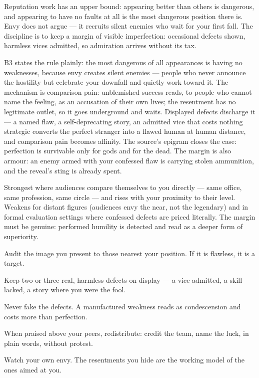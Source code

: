 \begin{core}
Reputation work has an upper bound: appearing better than others is dangerous, and appearing to have no faults at all is the most dangerous position there is. Envy does not argue --- it recruits silent enemies who wait for your first fall. The discipline is to keep a margin of visible imperfection: occasional defects shown, harmless vices admitted, so admiration arrives without its tax.
\end{core}
\begin{mechanism}
B3 states the rule plainly: the most dangerous of all appearances is having no weaknesses, because envy creates silent enemies --- people who never announce the hostility but celebrate your downfall and quietly work toward it. The mechanism is comparison pain: unblemished success reads, to people who cannot name the feeling, as an accusation of their own lives; the resentment has no legitimate outlet, so it goes underground and waits. Displayed defects discharge it --- a named flaw, a self-deprecating story, an admitted vice that costs nothing strategic converts the perfect stranger into a flawed human at human distance, and comparison pain becomes affinity. The source's epigram closes the case: perfection is survivable only for gods and for the dead. The margin is also armour: an enemy armed with your confessed flaw is carrying stolen ammunition, and the reveal's sting is already spent.
\end{mechanism}
\begin{conditions}
Strongest where audiences compare themselves to you directly --- same office, same profession, same circle --- and rises with your proximity to their level. Weakens for distant figures (audiences envy the near, not the legendary) and in formal evaluation settings where confessed defects are priced literally. The margin must be genuine: performed humility is detected and read as a deeper form of superiority.
\end{conditions}
\begin{application}
  \item Audit the image you present to those nearest your position. If it is flawless, it is a target.
  \item Keep two or three real, harmless defects on display --- a vice admitted, a skill lacked, a story where you were the fool.
  \item Never fake the defects. A manufactured weakness reads as condescension and costs more than perfection.
  \item When praised above your peers, redistribute: credit the team, name the luck, in plain words, without protest.
  \item Watch your own envy. The resentments you hide are the working model of the ones aimed at you.
\end{application}
